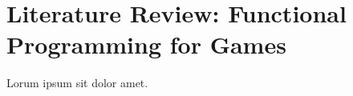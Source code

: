 \section{Literature Review: Functional Programming for Games}
\label{sec:fp_review}

Lorum ipsum sit dolor amet.  \lipsum[2-4]

\label{cf:code_organisation} %